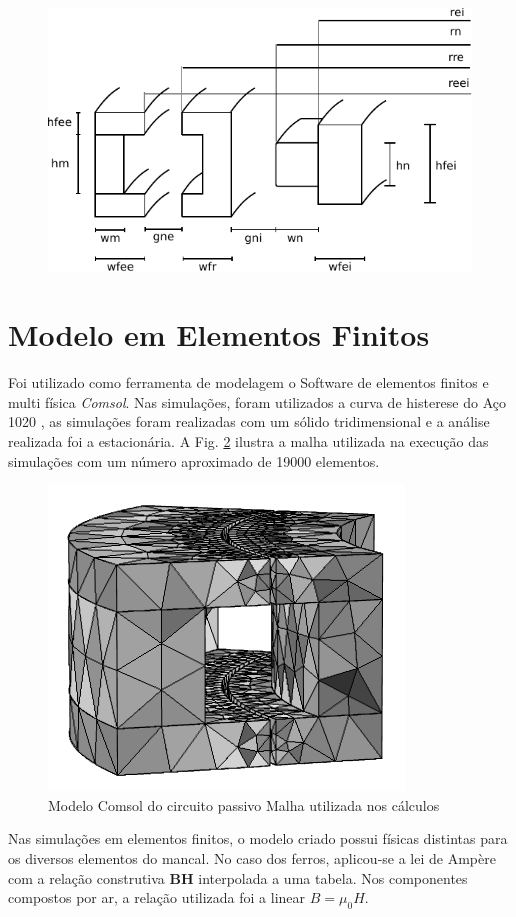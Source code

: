 \begin{figure}[th!]
	\centering
	\includegraphics[width=0.8\linewidth]{Figs/modelo_dimensoes}
	\caption{}
	\label{fig:modelo_dimensoes}
\end{figure}

 \section{Modelo em Elementos Finitos}
 
 Foi utilizado como ferramenta de modelagem o Software de elementos finitos e multi física \textit{Comsol}. Nas simulações, foram utilizados a curva de histerese do Aço 1020 , as simulações foram realizadas com um sólido tridimensional e a análise realizada foi a estacionária.  A Fig. \ref{Fig:Simulacao:Passivo:Mesh} ilustra a malha utilizada na execução das simulações com um número aproximado de 19000 elementos.
 
 \begin{figure}[!ht]
 	\centering
 	\includegraphics[width=0.5 \columnwidth,angle=0]{Figs/Simulacoes/Passivo/3D_Mesh=1,2.png}
 	\caption{Modelo Comsol do circuito passivo Malha utilizada nos cálculos}
 	\label{Fig:Simulacao:Passivo:Mesh}
 \end{figure}
 
Nas simulações em elementos finitos, o modelo criado possui físicas distintas para os diversos elementos do mancal. No caso dos ferros, aplicou-se a lei de Ampère com a relação construtiva \textbf{BH} interpolada a uma  tabela. Nos componentes compostos por ar, a relação utilizada foi a linear $B=\mu_0 H$. 

